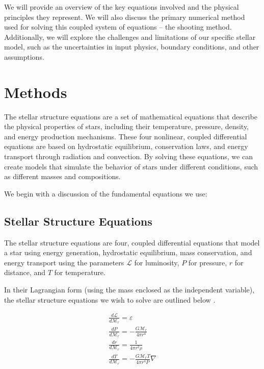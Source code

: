 \documentclass[twocolumn]{aastex631}
\begin{document}
We will provide an overview of the key equations involved and the physical principles they represent. We will also discuss the primary numerical method used for solving this coupled system of equations -- the shooting method. Additionally, we will explore the challenges and limitations of our specific stellar model, such as the uncertainties in input physics, boundary conditions, and other assumptions.

\section{Methods} \label{sec:method}

The stellar structure equations are a set of mathematical equations that describe the physical properties of stars, including their temperature, pressure, density, and energy production mechanisms. These four nonlinear, coupled differential equations are based on hydrostatic equilibrium, conservation laws, and energy transport through radiation and convection. By solving these equations, we can create  models that simulate the behavior of stars under different conditions, such as different masses and compositions.

We begin with a discussion of the fundamental equations we use:

\subsection{Stellar Structure Equations}

The stellar structure equations are four, coupled differential equations that model a star using energy generation, hydrostatic equilibrium, mass conservation, and energy transport using the parameters $\mathcal{L}$ for luminosity, $P$ for pressure, $r$ for distance, and $T$ for temperature.

In their Lagrangian form (using the mass enclosed as the independent variable), the stellar structure equations we wish to solve are outlined below \citep{stelstrucev}.

\begin{equation}
\boxed{
\begin{array}{lcl}
\frac{d\mathcal{L}}{d\mathcal{M}_r} = \varepsilon \\
\frac{d P}{d\mathcal{M}_r} = - \frac{G\mathcal{M}_r}{4\pi r^4} \\
\frac{d r}{d\mathcal{M}_r} = \frac{1}{4\pi r^2\rho} \\
\frac{d T}{d\mathcal{M}_r} = -\frac{G\mathcal{M}_r T}{4\pi r^4 P}\nabla \\
\end{array}
}
\end{equation}
\end{document}
